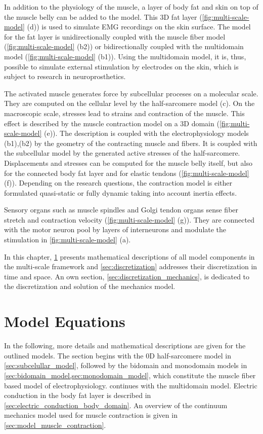 In addition to the physiology of the muscle, a layer of body fat and skin on top of the muscle belly can be added to the model. This 3D fat layer (\cref{fig:multi-scale-model} (d)) is used to simulate EMG recordings on the skin surface. The model for the fat layer is unidirectionally coupled with the muscle fiber model (\cref{fig:multi-scale-model} (b2)) or bidirectionally coupled with the multidomain model (\cref{fig:multi-scale-model} (b1)). Using the multidomain model, it is, thus, possible to simulate external stimulation by electrodes on the skin, which is subject to research in neuroprosthetics.

The activated muscle generates force by subcellular proceses on a molecular scale. They are computed on the cellular level by the half-sarcomere model (c). On the macroscopic scale, stresses lead to strains and contraction of the muscle. This effect is described by the muscle contraction model on a 3D domain (\cref{fig:multi-scale-model} (e)). 
The description is coupled with the electrophysiology models (b1),(b2) by the geometry of the contracting muscle and fibers. It is coupled with the subcellular model by the generated active stresses of the half-sarcomere. Displacements and stresses can be computed for the muscle belly itself, but also for the connected body fat layer and for elastic tendons (\cref{fig:multi-scale-model} (f)). Depending on the research questions, the contraction model is either formulated quasi-static or fully dynamic taking into account inertia effects.

Sensory organs such as muscle spindles and Golgi tendon organs sense fiber stretch and contraction velocity (\cref{fig:multi-scale-model} (g)). They are connected with the motor neuron pool by layers of interneurons and modulate the stimulation in \cref{fig:multi-scale-model} (a).

In this chapter, \cref{sec:model_equations} presents mathematical descriptions of all model components in the multi-scale framework and \cref{sec:discretization} addresses their discretization in time and space. An own section, \cref{sec:discretization_mechanics}, is dedicated to the discretization and solution of the mechanics model.

\section{Model Equations}\label{sec:model_equations}
In the following, more details and mathematical descriptions are given for the outlined models. The section begins with the 0D half-sarcomere model in \cref{sec:subcelullar_model}, followed by the bidomain and monodomain models in \cref{sec:bidomain_model,sec:monodomain_model}, which constitute the muscle fiber based model of electrophysiology.  continues with the multidomain model. Electric conduction in the body fat layer is described in \cref{sec:electric_conduction_body_domain}. An overview of the continuum mechanics model used for muscle contraction is given in \cref{sec:model_muscle_contraction}.
